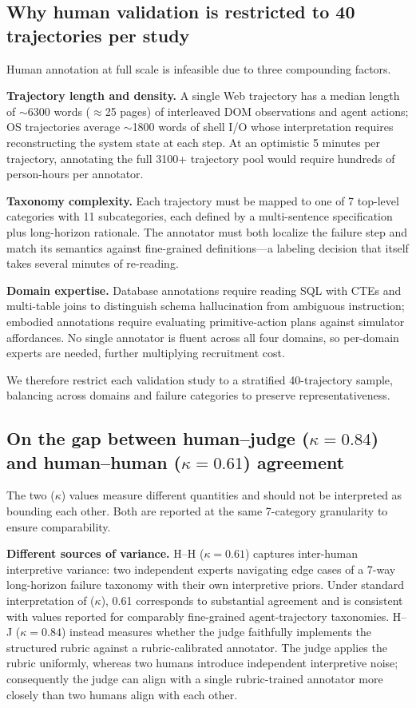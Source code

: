 \documentclass[11pt]{article}
\begin{document}
\subsection{Why human validation is restricted to 40 trajectories per study}
Human annotation at full scale is infeasible due to three compounding factors.

\textbf{Trajectory length and density.} A single Web trajectory has a median length of $\sim$6300 words ($\approx$25 pages) of interleaved DOM observations and agent actions; OS trajectories average $\sim$1800 words of shell I/O whose interpretation requires reconstructing the system state at each step. At an optimistic 5 minutes per trajectory, annotating the full 3100+ trajectory pool would require hundreds of person-hours per annotator.

\textbf{Taxonomy complexity.} Each trajectory must be mapped to one of 7 top-level categories with 11 subcategories, each defined by a multi-sentence specification plus long-horizon rationale. The annotator must both localize the failure step and match its semantics against fine-grained definitions---a labeling decision that itself takes several minutes of re-reading.

\textbf{Domain expertise.} Database annotations require reading SQL with CTEs and multi-table joins to distinguish schema hallucination from ambiguous instruction; embodied annotations require evaluating primitive-action plans against simulator affordances. No single annotator is fluent across all four domains, so per-domain experts are needed, further multiplying recruitment cost.

We therefore restrict each validation study to a stratified 40-trajectory sample, balancing across domains and failure categories to preserve representativeness.

\subsection{On the gap between human--judge ($\kappa=0.84$) and human--human ($\kappa=0.61$) agreement}
The two ($\kappa$) values measure different quantities and should not be interpreted as bounding each other. Both are reported at the same 7-category granularity to ensure comparability.

\textbf{Different sources of variance.} H--H ($\kappa=0.61$) captures inter-human interpretive variance: two independent experts navigating edge cases of a 7-way long-horizon failure taxonomy with their own interpretive priors. Under standard interpretation of ($\kappa$), 0.61 corresponds to substantial agreement and is consistent with values reported for comparably fine-grained agent-trajectory taxonomies. H--J ($\kappa=0.84$) instead measures whether the judge faithfully implements the structured rubric against a rubric-calibrated annotator. The judge applies the rubric uniformly, whereas two humans introduce independent interpretive noise; consequently the judge can align with a single rubric-trained annotator more closely than two humans align with each other.
\end{document}
